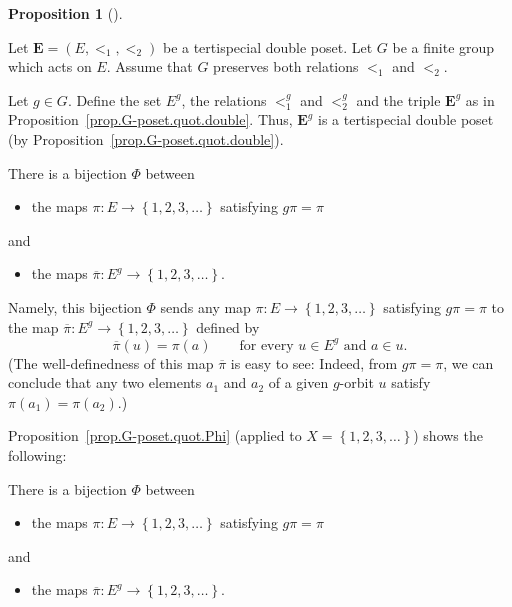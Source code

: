 \documentclass[numbers=enddot,12pt,final,onecolumn,notitlepage,abstracton]{scrartcl}
\theoremstyle{definition}
\newtheorem{prop}[theo]{Proposition}
\newenvironment{proposition}[1][]
{\begin{prop}[#1]\begin{leftbar}}
{\end{leftbar}\end{prop}}
\newenvironment{verlong}{}{}
\newenvironment{vershort}{}{}
\newcommand{\EE}{{\mathbf{E}}}
\begin{document}
\begin{proposition}
\label{prop.G-poset.quot.Phi}
Let $\EE = \left(E, <_1, <_2\right)$ be a tertispecial double poset.
Let $G$ be a finite group which acts on $E$. Assume that $G$ preserves
both relations $<_1$ and $<_2$.

Let $g \in G$. Define the set $E^g$, the relations $<_1^g$ and $<_2^g$
and the triple $\EE^g$ as in Proposition~\ref{prop.G-poset.quot.double}.
Thus, $\EE^g$ is a tertispecial double poset (by
Proposition~\ref{prop.G-poset.quot.double}).

\begin{vershort}
There is a bijection $\Phi$ between

\begin{itemize}
\item the maps $\pi:E\rightarrow\left\{  1,2,3,\ldots\right\}  $ satisfying
$g\pi=\pi$
\end{itemize}

and

\begin{itemize}
\item the maps $\overline{\pi}:E^{g}\rightarrow\left\{  1,2,3,\ldots\right\}
$.
\end{itemize}

Namely, this bijection $\Phi$ sends any map
$\pi:E\rightarrow\left\{  1,2,3,\ldots \right\}  $ satisfying $g\pi=\pi$
to the map $\overline{\pi}:E^{g}
\rightarrow\left\{  1,2,3,\ldots\right\}  $ defined by
\[
\overline{\pi}\left( u \right)
= \pi\left( a \right)
\qquad\text{for every } u \in E^{g} \text{ and } a \in u.
\]
(The well-definedness of this map $\overline{\pi}$ is easy to see:
Indeed, from $g\pi=\pi$, we can conclude that any two elements
$a_1$ and $a_2$ of a given $g$-orbit $u$ satisfy
$\pi\left(a_1\right) = \pi\left(a_2\right)$.)
\end{vershort}

\begin{verlong}
Proposition~\ref{prop.G-poset.quot.Phi} (applied to
$X = \left\{1,2,3,\ldots\right\}$) shows the following:

There is a bijection $\Phi$ between

\begin{itemize}
\item the maps $\pi:E\rightarrow\left\{  1,2,3,\ldots\right\}  $ satisfying
$g\pi=\pi$
\end{itemize}

and

\begin{itemize}
\item the maps $\overline{\pi}:E^{g}\rightarrow\left\{  1,2,3,\ldots\right\}
$.
\end{itemize}


\end{verlong}
\end{proposition}
\end{document}
